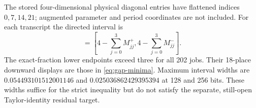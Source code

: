 The stored four-dimensional physical diagonal entries have flattened
indices \(0,7,14,21\); augmented parameter and period coordinates are not
included.  For each transcript the directed interval is
\begin{equation}
 [D_M]=
 \left[4-\sum_{j=0}^{3}M_{jj}^{+},
       4-\sum_{j=0}^{3}M_{jj}^{-}\right].
 \label{eq:directed-det-interval}
\end{equation}
The exact-fraction lower endpoints exceed three for all 202 jobs.  Their
18-place downward displays are those in \cref{eq:gap-minima}.  Maximum
interval widths are \(0.054493101512001146\) and
\(0.025036862429395394\) at 128 and 256 bits.  These widths suffice for the
strict inequality but do not satisfy the separate, still-open
Taylor-identity residual target.
